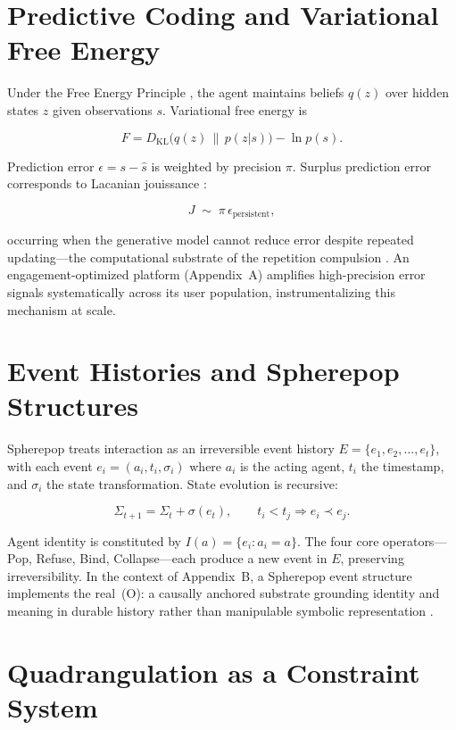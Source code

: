 \documentclass[12pt,a4paper]{article}
\begin{document}
\section{Predictive Coding and Variational Free Energy}

Under the Free Energy Principle \citep{friston2010}, the agent maintains beliefs $q(z)$ over
hidden states $z$ given observations $s$. Variational free energy is

\[
F = D_{\mathrm{KL}}\!\bigl(q(z)\,\|\,p(z|s)\bigr) - \ln p(s).
\]

Prediction error $\epsilon = s - \hat{s}$ is weighted by precision $\pi$. Surplus prediction
error corresponds to Lacanian jouissance \citep{lacan2006,dallaglio2024}:

\[
J \;\sim\; \pi\,\epsilon_{\mathrm{persistent}},
\]

occurring when the generative model cannot reduce error despite repeated updating---the
computational substrate of the repetition compulsion \citep{freud1920}. An engagement-optimized
platform (Appendix~A) amplifies high-precision error signals systematically across its user
population, instrumentalizing this mechanism at scale.

\section{Event Histories and Spherepop Structures}

Spherepop treats interaction as an irreversible event history
$E = \{e_1, e_2, \dots, e_t\}$, with each event $e_i = (a_i, t_i, \sigma_i)$ where $a_i$
is the acting agent, $t_i$ the timestamp, and $\sigma_i$ the state transformation. State
evolution is recursive:

\[
\Sigma_{t+1} = \Sigma_t + \sigma(e_t), \qquad t_i < t_j \Rightarrow e_i \prec e_j.
\]

Agent identity is constituted by $I(a) = \{e_i : a_i = a\}$. The four core operators---Pop,
Refuse, Bind, Collapse---each produce a new event in $E$, preserving irreversibility.
In the context of Appendix~B, a Spherepop event structure implements the real~(O): a causally
anchored substrate grounding identity and meaning in durable history rather than manipulable
symbolic representation \citep{jelinek2026}.

\section{Quadrangulation as a Constraint System}
\end{document}
